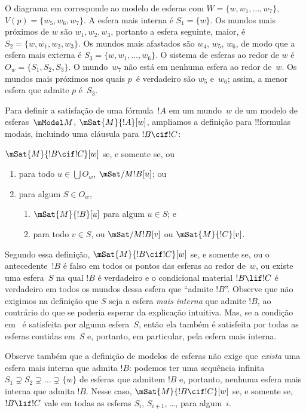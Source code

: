\documentclass[../../../include/open-logic-section]{subfiles}
\begin{document}
O diagrama em  corresponde ao modelo de
esferas com $W = \{w, w_1, \dots, w_7\}$, $V(p) = \{w_5, w_6,
w_7\}$. A esfera mais interna é $S_1 = \{w\}$. Os mundos mais próximos de $w$
são $w_1, w_2, w_3$, portanto a esfera seguinte, maior, é $S_2 = \{w, w_1,
w_2, w_3\}$. Os mundos mais afastados são $w_4$, $w_5$, $w_6$, de modo que a
esfera mais externa é $S_3 = \{w, w_1, \dots, w_6\}$. O sistema de
esferas ao redor de $w$ é $O_w = \{S_1, S_2, S_3\}$. O mundo~$w_7$ não está
em nenhuma esfera ao redor de~$w$. Os mundos mais próximos nos quais $p$~é verdadeiro
são $w_5$ e~$w_6$; assim, a menor esfera que admite $p$
é~$S_3$.

Para definir a satisfação de uma fórmula~$!A$ em um mundo~$w$ de um modelo de
esferas~$\mModel M$, $\mSat{M}{!A}[w]$, ampliamos a definição para
!!{formula}s modais, incluindo uma cláusula para $!B \cif !C$:

\begin{defn}
  $\mSat{M}{!B \cif !C}[w]$ se, e somente se, ou
  \begin{enumerate}
  \item{} para todo $u \in \bigcup O_w$, $\mSat/{M}{!B}[u]$; ou
  \item{} para algum $S \in O_w$,
    \begin{enumerate}
      \item $\mSat{M}{!B}[u]$ para algum $u \in
        S$; e
      \item para todo $v \in S$, ou
        $\mSat/{M}{!B}[v]$ ou $\mSat{M}{!C}[v]$.
    \end{enumerate}
  \end{enumerate}
\end{defn}

Segundo essa definição, $\mSat{M}{!B \cif !C}[w]$ se, e somente se, ou o
antecedente~$!B$ é falso em todos os pontos das esferas ao redor de~$w$, ou
existe uma esfera~$S$ na qual $!B$ é verdadeiro e o condicional material
$!B \lif !C$ é verdadeiro em todos os mundos dessa esfera que
``admite $!B$''. Observe que não exigimos na definição que $S$ seja a
esfera \emph{mais interna} que admite $!B$, ao contrário do que se poderia
esperar da explicação intuitiva. Mas, se a condição
em~ é satisfeita por alguma esfera~$S$, então ela também é
satisfeita por todas as esferas contidas em~$S$ e, portanto, em particular,
pela esfera mais interna.

Observe também que a definição de modelos de esferas não exige que
\emph{exista} uma esfera mais interna que admita $!B$: podemos ter uma
sequência infinita $S_1 \supsetneq S_2 \supsetneq \dots \supsetneq
\{w\}$ de esferas que admitem $!B$ e, portanto, nenhuma esfera mais interna
que admita $!B$. Nesse caso, $\mSat{M}{!B \cif !C}[w]$ se, e somente se,
$!B \lif !C$ vale em todas as esferas $S_i$, $S_{i+1}$, \dots, para
algum~$i$.
\end{document}
